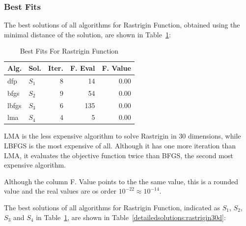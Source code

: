 \documentclass[conference]{IEEEtran}
\begin{document}
\subsubsection{Best Fits}
\label{bestfitsrastrigin30d30D}


The best solutions of all algorithms for Rastrigin Function, obtained using the minimal
distance of the solution, are shown in Table~\ref{solutions:rastrigin30d}:

\begin{table}[H]
\centering
\caption{Best Fits For Rastrigin Function}
\label{solutions:rastrigin30d}
\begin{tabular}{llrrr}
\toprule
 Alg. &    Sol. &  Iter. &  F. Eval &  F. Value \\
\midrule
  dfp & $S_{1}$ &      8 &       14 &      0.00 \\
 bfgs & $S_{2}$ &      9 &       54 &      0.00 \\
lbfgs & $S_{3}$ &      6 &      135 &      0.00 \\
  lma & $S_{4}$ &      4 &        5 &      0.00 \\
\bottomrule
\end{tabular}
\end{table}

LMA is the less expensive algorithm to solve Rastrigin in 30 dimensions, while LBFGS
is the most expensive of all. Although it has one more iteration than LMA, it evaluates
the objective function twice than BFGS, the second most expensive algorithm.

Although the column F. Value points to the the same value, this is a rounded value
and the real values are os order $10^{-22} \approx 10^{-14}$.


The best solutions of all algorithms for Rastrigin Function, indicated as
$S_{1}$, $S_{2}$, $S_{3}$ and $S_{4}$ in Table~\ref{solutions:rastrigin30d}, are shown
in Table~\ref{detailedsolutions:rastrigin30d}:
\end{document}
